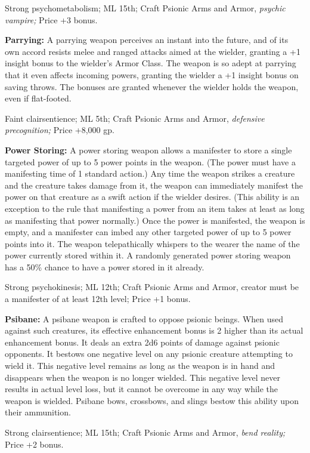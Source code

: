 \documentclass{article}
\begin{document}
Strong psychometabolism; ML 15th; Craft Psionic Arms and Armor, \textit{psychic 
vampire; }Price +3 bonus.

\textbf{Parrying: }A parrying weapon perceives an instant into the future, and 
of its own accord resists melee and ranged attacks aimed at the wielder, granting 
a +1 insight bonus to the wielder's Armor Class. The weapon is so adept at parrying 
that it even affects incoming powers, granting the wielder a +1 insight bonus on 
saving throws. The bonuses are granted whenever the wielder holds the weapon, even 
if flat-footed.

Faint clairsentience; ML 5th; Craft Psionic Arms and Armor, \textit{defensive precognition; 
}Price +8,000 gp.

\textbf{Power Storing:} A power storing weapon allows a manifester to store a single 
targeted power of up to 5 power points in the weapon. (The power must have a manifesting 
time of 1 standard action.) Any time the weapon strikes a creature and the creature 
takes damage from it, the weapon can immediately manifest the power on that creature 
as a swift action if the wielder desires. (This ability is an exception to the 
rule that manifesting a power from an item takes at least as long as manifesting 
that power normally.) Once the power is manifested, the weapon is empty, and a 
manifester can imbed any other targeted power of up to 5 power points into it. 
The weapon telepathically whispers to the wearer the name of the power currently 
stored within it. A randomly generated power storing weapon has a 50\% chance to 
have a power stored in it already.

Strong psychokinesis; ML 12th; Craft Psionic Arms and Armor, creator must be a 
manifester of at least 12th level; Price +1 bonus.

\textbf{Psibane:} A psibane weapon is crafted to oppose psionic beings. When used 
against such creatures, its effective enhancement bonus is 2 higher than its actual 
enhancement bonus. It deals an extra 2d6 points of damage against psionic opponents. 
It bestows one negative level on any psionic creature attempting to wield it. This 
negative level remains as long as the weapon is in hand and disappears when the 
weapon is no longer wielded. This negative level never results in actual level 
loss, but it cannot be overcome in any way while the weapon is wielded. Psibane 
bows, crossbows, and slings bestow this ability upon their ammunition.

Strong clairsentience; ML 15th; Craft Psionic Arms and Armor, \textit{bend reality; 
}Price +2 bonus.
\end{document}
